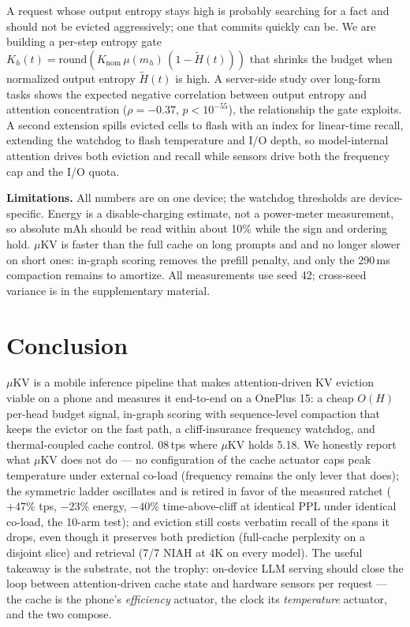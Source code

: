 \documentclass[sigconf, anonymous=false, screen=true]{acmart}
\begin{document}
A request whose output entropy stays high is probably searching for a fact and should not be evicted aggressively; one that commits quickly can be. We are building a per-step entropy gate $K_h(t) = \mathrm{round}(K_{\text{nom}}\,\mu(m_h)\,(1-\tilde{H}(t)))$ that shrinks the budget when normalized output entropy $\tilde{H}(t)$ is high. A server-side study over long-form tasks shows the expected negative correlation between output entropy and attention concentration ($\rho=-0.37$, $p<10^{-55}$), the relationship the gate exploits. A second extension spills evicted cells to flash with an index for linear-time recall, extending the watchdog to flash temperature and I/O depth, so model-internal attention drives both eviction and recall while sensors drive both the frequency cap and the I/O quota.

\textbf{Limitations.} All numbers are on one device; the watchdog thresholds are device-specific. Energy is a disable-charging estimate, not a power-meter measurement, so absolute mAh should be read within about 10\% while the sign and ordering hold. $\mu$KV is faster than the full cache on long prompts and and no longer slower on short ones: in-graph scoring removes the prefill penalty, and only the 290\,ms compaction remains to amortize. All measurements use seed 42; cross-seed variance is in the supplementary material.

\section{Conclusion}
\label{sec:conclusion}

$\mu$KV is a mobile inference pipeline that makes attention-driven KV eviction viable on a phone and measures it end-to-end on a OnePlus 15: a cheap $O(H)$ per-head budget signal, in-graph scoring with sequence-level compaction that keeps the evictor on the fast path, a cliff-insurance frequency watchdog, and thermal-coupled cache control.  08\,tps where $\mu$KV holds 5.18. We honestly report what $\mu$KV does not do --- no configuration of the cache actuator caps peak temperature under external co-load (frequency remains the only lever that does); the symmetric ladder oscillates and is retired in favor of the measured ratchet ($+47\%$ tps, $-23\%$ energy, $-40\%$ time-above-cliff at identical PPL under identical co-load, the 10-arm test); and eviction still costs verbatim recall of the spans it drops, even though it preserves both prediction (full-cache perplexity on a disjoint slice) and retrieval (7/7 NIAH at 4K on every model). The useful takeaway is the substrate, not the trophy: on-device LLM serving should close the loop between attention-driven cache state and hardware sensors per request --- the cache is the phone's \emph{efficiency} actuator, the clock its \emph{temperature} actuator, and the two compose.
\end{document}

